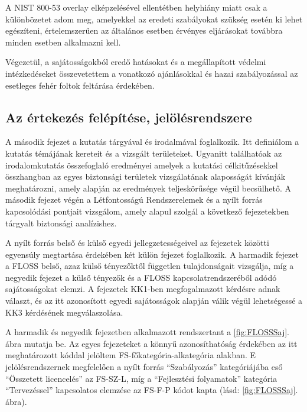 \documentclass[12pt,magyar,a4paper,oneside]{scrreprt}
\begin{document}
A NIST 800-53 overlay elképzelésével ellentétben helyhiány miatt csak a
különbözetet adom meg, amelyekkel az eredeti szabályokat szükség esetén
ki lehet egészíteni, értelemszerűen az általános esetben érvényes
eljárásokat továbbra minden esetben alkalmazni kell.

Végezetül, a sajátosságokból eredő hatásokat és a megállapított védelmi
intézkedéseket összevetettem a vonatkozó ajánlásokkal és hazai
szabályozással az esetleges fehér foltok feltárása érdekében.

\hypertarget{az-uxe9rtekezuxe9s-feluxe9puxedtuxe9se-jeluxf6luxe9srendszere}{%
\subsection{Az értekezés felépítése,
jelölésrendszere}\label{az-uxe9rtekezuxe9s-feluxe9puxedtuxe9se-jeluxf6luxe9srendszere}}

A második fejezet a kutatás tárgyával és irodalmával foglalkozik. Itt
definiálom a kutatás témájának kereteit és a vizsgált területeket.
Ugyanitt találhatóak az irodalomkutatás összefoglaló eredményei amelyek
a kutatási célkitűzésekkel összhangban az egyes biztonsági területek
vizsgálatának alaposságát kívánják meghatározni, amely alapján az
eredmények teljeskörűsége végül becsülhető. A második fejezet végén a
Létfontosságú Rendszerelemek és a nyílt forrás kapcsolódási pontjait
vizsgálom, amely alapul szolgál a következő fejezetekben tárgyalt
biztonsági analízishez.

A nyílt forrás belső és külső egyedi jellegzetességeivel az fejezetek
közötti egyensúly megtartása érdekében két külön fejezet foglalkozik. A
harmadik fejezet a FLOSS belső, azaz külső tényezőktől független
tulajdonságait vizsgálja, míg a negyedik fejezet a külső tényezők és a
FLOSS kapcsolatrendszeréből adódó sajátosságokat elemzi. A fejezetek
KK1-ben megfogalmazott kérdésre adnak választ, és az itt azonosított
egyedi sajátosságok alapján válik végül lehetségessé a KK3 kérdésének
megválaszolása.

A harmadik és negyedik fejezetben alkalmazott rendszertant a
\ref{fig:FLOSSSaj}. ábra mutatja be. Az egyes fejezeteket a könnyű
azonosíthatóság érdekében az itt meghatározott kóddal jelöltem
FS-főkategória-alkategória alakban. E jelölésrendszernek megfelelően a
nyílt forrás ``Szabályozás'' kategóriájába eső ``Összetett licencelés''
az FS-SZ-L, míg a ``Fejlesztési folyamatok'' kategória ``Tervezéssel''
kapcsolatos elemzése az FS-F-P kódot kapta (lásd: \ref{fig:FLOSSSaj}.
ábra).
\end{document}
